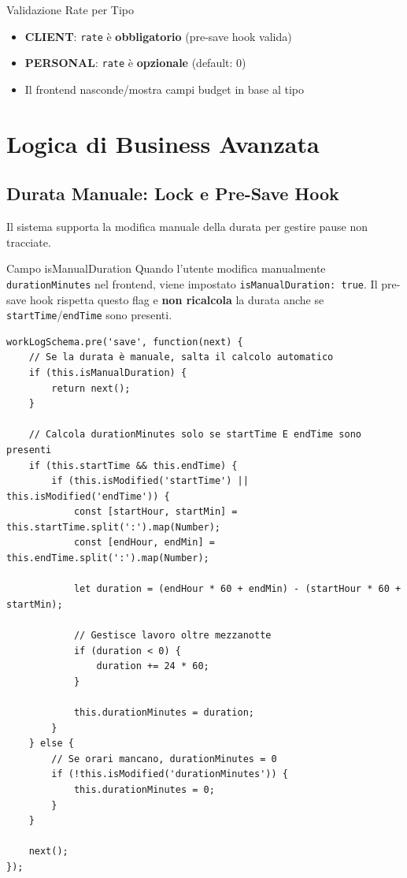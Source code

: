 \documentclass[11pt,a4paper]{article}
\begin{document}
\begin{tipbox}{Validazione Rate per Tipo}
\begin{itemize}
    \item \textbf{CLIENT}: \texttt{rate} è \textbf{obbligatorio} (pre-save hook valida)
    \item \textbf{PERSONAL}: \texttt{rate} è \textbf{opzionale} (default: 0)
    \item Il frontend nasconde/mostra campi budget in base al tipo
\end{itemize}
\end{tipbox}

\section{Logica di Business Avanzata}

\subsection{Durata Manuale: Lock e Pre-Save Hook}

Il sistema supporta la modifica manuale della durata per gestire pause non tracciate.

\begin{importantbox}{Campo isManualDuration}
Quando l'utente modifica manualmente \texttt{durationMinutes} nel frontend, viene impostato \texttt{isManualDuration: true}.
Il pre-save hook rispetta questo flag e \textbf{non ricalcola} la durata anche se \texttt{startTime}/\texttt{endTime} sono presenti.
\end{importantbox}

\begin{lstlisting}[caption=Pre-Save Hook con Lock Durata]
workLogSchema.pre('save', function(next) {
    // Se la durata è manuale, salta il calcolo automatico
    if (this.isManualDuration) {
        return next();
    }

    // Calcola durationMinutes solo se startTime E endTime sono presenti
    if (this.startTime && this.endTime) {
        if (this.isModified('startTime') || this.isModified('endTime')) {
            const [startHour, startMin] = this.startTime.split(':').map(Number);
            const [endHour, endMin] = this.endTime.split(':').map(Number);
            
            let duration = (endHour * 60 + endMin) - (startHour * 60 + startMin);
            
            // Gestisce lavoro oltre mezzanotte
            if (duration < 0) {
                duration += 24 * 60;
            }
            
            this.durationMinutes = duration;
        }
    } else {
        // Se orari mancano, durationMinutes = 0
        if (!this.isModified('durationMinutes')) {
            this.durationMinutes = 0;
        }
    }
    
    next();
});
\end{lstlisting}
\end{document}
